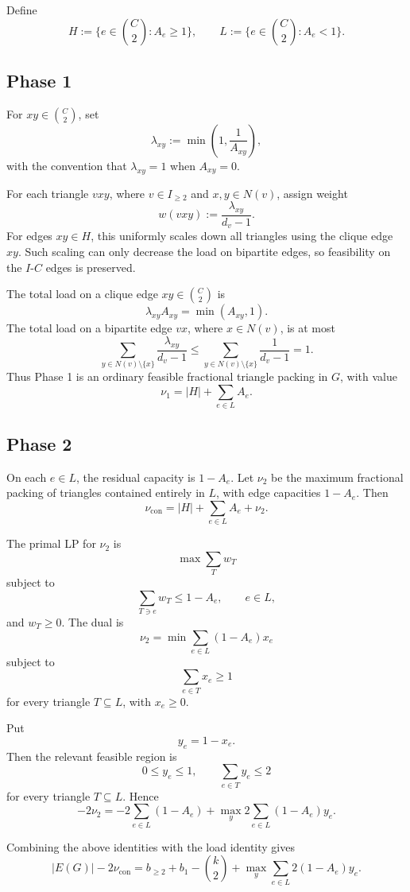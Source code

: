 \documentclass[11pt]{article}
\begin{document}
Define
\[
    H:=\{e\in \binom C2:A_e\ge1\},
    \qquad
    L:=\{e\in \binom C2:A_e<1\}.
\]

\subsection{Phase 1}

For \(xy\in \binom C2\), set
\[
    \lambda_{xy}:=\min\left(1,\frac1{A_{xy}}\right),
\]
with the convention that \(\lambda_{xy}=1\) when \(A_{xy}=0\).

For each triangle \(vxy\), where \(v\in I_{\ge2}\) and \(x,y\in N(v)\), assign weight
\[
    w(vxy):=\frac{\lambda_{xy}}{d_v-1}.
\]
For edges \(xy\in H\), this uniformly scales down all triangles using the clique edge \(xy\). Such scaling can only decrease the load on bipartite edges, so feasibility on the \(I\)-\(C\) edges is preserved.

The total load on a clique edge \(xy\in\binom C2\) is
\[
    \lambda_{xy}A_{xy}=\min(A_{xy},1).
\]
The total load on a bipartite edge \(vx\), where \(x\in N(v)\), is at most
\[
    \sum_{y\in N(v)\setminus\{x\}}\frac{\lambda_{xy}}{d_v-1}
    \le
    \sum_{y\in N(v)\setminus\{x\}}\frac1{d_v-1}=1.
\]
Thus Phase 1 is an ordinary feasible fractional triangle packing in \(G\), with value
\[
    \nu_1=|H|+\sum_{e\in L}A_e.
\]

\subsection{Phase 2}

On each \(e\in L\), the residual capacity is \(1-A_e\). Let \(\nu_2\) be the maximum fractional packing of triangles contained entirely in \(L\), with edge capacities \(1-A_e\). Then
\[
    \nu_{\mathrm{con}}=
    |H|+\sum_{e\in L}A_e+\nu_2.
\]

The primal LP for \(\nu_2\) is
\[
    \max \sum_T w_T
\]
subject to
\[
    \sum_{T\ni e}w_T\le 1-A_e,\qquad e\in L,
\]
and \(w_T\ge0\). The dual is
\[
    \nu_2=
    \min
    \sum_{e\in L}(1-A_e)x_e
\]
subject to
\[
    \sum_{e\in T}x_e\ge1
\]
for every triangle \(T\subseteq L\), with \(x_e\ge0\).

Put
\[
    y_e=1-x_e.
\]
Then the relevant feasible region is
\[
    0\le y_e\le1,
    \qquad
    \sum_{e\in T}y_e\le2
\]
for every triangle \(T\subseteq L\). Hence
\[
    -2\nu_2
    =
    -2\sum_{e\in L}(1-A_e)
    +
    \max_y
    2\sum_{e\in L}(1-A_e)y_e .
\]

Combining the above identities with the load identity gives
\[
    |E(G)|-2\nu_{\mathrm{con}}
    =
    b_{\ge2}+b_1-\binom{k}{2}
    +
    \max_y
    \sum_{e\in L}2(1-A_e)y_e .
\]
\end{document}

